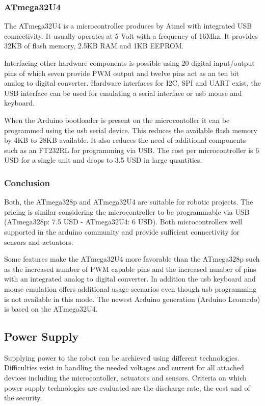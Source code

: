 \documentclass[11pt,a4paper]{article}
\begin{document}
\subsubsection{ATmega32U4}
The ATmega32U4 is a microcontroller produces by Atmel with integrated USB connectivity. It usually operates at 5 Volt with a frequency of 16Mhz. It provides 32KB of flash memory, 2.5KB RAM and 1KB EEPROM. 

Interfacing other hardware components is possible using 20 digital input/output pins of which seven provide PWM output and twelve pins act as an ten bit analog to digital converter. Hardware interfaces for I2C, SPI and UART exist, the USB interface can be used for emulating a serial interface or usb mouse and keyboard.

When the Arduino bootloader is present on the microcontoller it can be programmed using the usb serial device. This reduces the available flash memory by 4KB to 28KB available. It also reduces the need of additional components such as an FT232RL for programming via USB.
The cost per microcontroller is 6 USD for a single unit and drops to 3.5 USD in large quantities.
\subsubsection{Conclusion}
Both, the ATmega328p and ATmega32U4 are suitable for robotic projects. The pricing is similar considering the microcontroller to be programmable via USB (ATmega328p: 7.5 USD - ATmega32U4: 6 USD). Both microcontrollers well supported in the arduino community and provide sufficient connectivity for sensors and actuators.  

Some features make the ATmega32U4 more favorable than the ATmega328p such as the increased number of PWM capable pins and the increased number of pins with an integrated analog to digital converter. In addition the usb keyboard and mouse emulation offers additional usage scenarios even though usb programming is not available in this mode. The newest Arduino generation (Arduino Leonardo) is based on the ATmega32U4.
\subsection{Power Supply}
Supplying power to the robot can be archieved using different technologies. Difficulties exist in handling the needed voltages and current for all attached devices including the microcontoller, actuators and sensors. Criteria on which power supply technologies are evaluated are the discharge rate, the cost and of the security.
\end{document}
